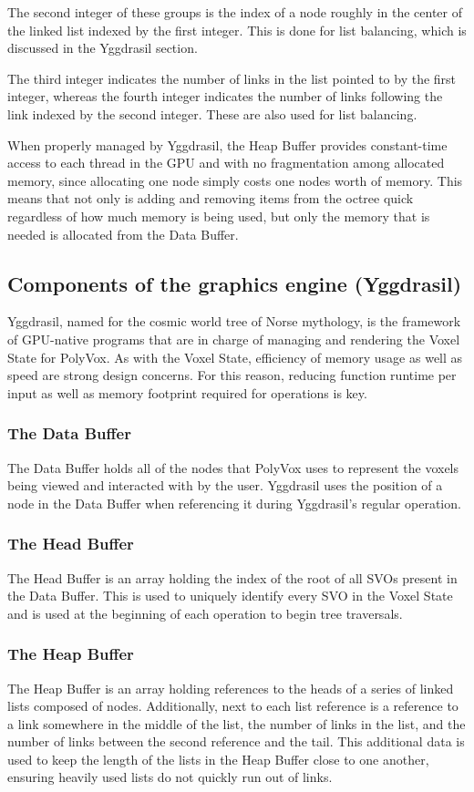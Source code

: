 \documentclass[onecolumn, draftclsnofoot,10pt, compsoc]{IEEEtran}
\begin{document}
The second integer of these groups is the index of a node roughly in the center of the linked list indexed by the first integer. This is done for list balancing, which is discussed in the Yggdrasil section.

The third integer indicates the number of links in the list pointed to by the first integer, whereas the fourth integer indicates the number of links following the link indexed by the second integer. These are also used for list balancing.

When properly managed by Yggdrasil, the Heap Buffer provides constant-time access to each thread in the GPU and with no fragmentation among allocated memory, since allocating one node simply costs one nodes worth of memory. This means that not only is adding and removing items from the octree quick regardless of how much memory is being used, but only the memory that is needed is allocated from the Data Buffer.

\subsection{Components of the graphics engine (Yggdrasil)}

Yggdrasil, named for the cosmic world tree of Norse mythology, is the framework of GPU-native programs that are in charge of managing and rendering the Voxel State for PolyVox. As with the Voxel State, efficiency of memory usage as well as speed are strong design concerns. For this reason, reducing function runtime per input as well as memory footprint required for operations is key.

\subsubsection{The Data Buffer}
The Data Buffer holds all of the nodes that PolyVox uses to represent the voxels being viewed and interacted with by the user. Yggdrasil uses the position of a node in the Data Buffer when referencing it during Yggdrasil’s regular operation.
\subsubsection{The Head Buffer}
The Head Buffer is an array holding the index of the root of all SVOs present in the Data Buffer. This is used to uniquely identify every SVO in the Voxel State and is used at the beginning of each operation to begin tree traversals.
\subsubsection{The Heap Buffer}
The Heap Buffer is an array holding references to the heads of a series of linked lists composed of nodes. Additionally, next to each list reference is a reference to a link somewhere in the middle of the list, the number of links in the list, and the number of links between the second reference and the tail. This additional data is used to keep the length of the lists in the Heap Buffer close to one another, ensuring heavily used lists do not quickly run out of links.
\end{document}
